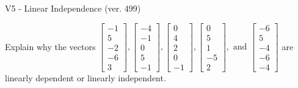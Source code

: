 \begin{exercise}
  \begin{exerciseTitle}V5 - Linear Independence (ver. 499)\end{exerciseTitle}
  \begin{exerciseStatement}
    Explain why the vectors \(\left[\begin{array}{r}
-1 \\
5 \\
-2 \\
-6 \\
3
\end{array}\right] , \left[\begin{array}{r}
-4 \\
-1 \\
0 \\
5 \\
-1
\end{array}\right] , \left[\begin{array}{r}
0 \\
4 \\
2 \\
0 \\
-1
\end{array}\right] , \left[\begin{array}{r}
0 \\
5 \\
1 \\
-5 \\
2
\end{array}\right] , \text{ and } \left[\begin{array}{r}
-6 \\
5 \\
-4 \\
-6 \\
-4
\end{array}\right]\) are linearly dependent or linearly independent.	



\end{exerciseStatement}
\end{exercise}

